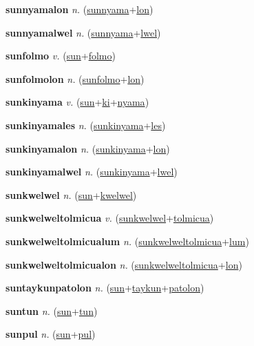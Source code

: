\textbf{\hypertarget{sunnyamalon}{sunnyamalon}} \textit{n.} (\hyperlink{sunnyama}{sunnyama}+\allowbreak \hyperlink{lon}{lon})


\textbf{\hypertarget{sunnyamalwel}{sunnyamalwel}} \textit{n.} (\hyperlink{sunnyama}{sunnyama}+\allowbreak \hyperlink{lwel}{lwel})


\textbf{\hypertarget{sunfolmo}{sunfolmo}} \textit{v.} (\hyperlink{sun}{sun}+\allowbreak \hyperlink{folmo}{folmo})


\textbf{\hypertarget{sunfolmolon}{sunfolmolon}} \textit{n.} (\hyperlink{sunfolmo}{sunfolmo}+\allowbreak \hyperlink{lon}{lon})


\textbf{\hypertarget{sunkinyama}{sunkinyama}} \textit{v.} (\hyperlink{sun}{sun}+\allowbreak \hyperlink{ki}{ki}+\allowbreak \hyperlink{nyama}{nyama})


\textbf{\hypertarget{sunkinyamales}{sunkinyamales}} \textit{n.} (\hyperlink{sunkinyama}{sunkinyama}+\allowbreak \hyperlink{les}{les})


\textbf{\hypertarget{sunkinyamalon}{sunkinyamalon}} \textit{n.} (\hyperlink{sunkinyama}{sunkinyama}+\allowbreak \hyperlink{lon}{lon})


\textbf{\hypertarget{sunkinyamalwel}{sunkinyamalwel}} \textit{n.} (\hyperlink{sunkinyama}{sunkinyama}+\allowbreak \hyperlink{lwel}{lwel})


\textbf{\hypertarget{sunkwelwel}{sunkwelwel}} \textit{n.} (\hyperlink{sun}{sun}+\allowbreak \hyperlink{kwelwel}{kwelwel})


\textbf{\hypertarget{sunkwelweltolmicua}{sunkwelweltolmicua}} \textit{v.} (\hyperlink{sunkwelwel}{sunkwelwel}+\allowbreak \hyperlink{tolmicua}{tolmicua})


\textbf{\hypertarget{sunkwelweltolmicualum}{sunkwelweltolmicualum}} \textit{n.} (\hyperlink{sunkwelweltolmicua}{sunkwelweltolmicua}+\allowbreak \hyperlink{lum}{lum})


\textbf{\hypertarget{sunkwelweltolmicualon}{sunkwelweltolmicualon}} \textit{n.} (\hyperlink{sunkwelweltolmicua}{sunkwelweltolmicua}+\allowbreak \hyperlink{lon}{lon})


\textbf{\hypertarget{suntaykunpatolon}{suntaykunpatolon}} \textit{n.} (\hyperlink{sun}{sun}+\allowbreak \hyperlink{taykun}{taykun}+\allowbreak \hyperlink{patolon}{patolon})


\textbf{\hypertarget{suntun}{suntun}} \textit{n.} (\hyperlink{sun}{sun}+\allowbreak \hyperlink{tun}{tun})


\textbf{\hypertarget{sunpul}{sunpul}} \textit{n.} (\hyperlink{sun}{sun}+\allowbreak \hyperlink{pul}{pul})


